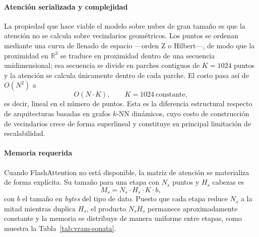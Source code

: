 \paragraph*{Atención serializada y complejidad}
La propiedad que hace viable el modelo sobre nubes de gran tamaño es que la
atención no se calcula sobre vecindarios geométricos. Los puntos se ordenan
mediante una curva de llenado de espacio ---orden Z o Hilbert---, de modo que la
proximidad en $\mathbb{R}^{3}$ se traduce en proximidad dentro de una secuencia
unidimensional; esa secuencia se divide en parches contiguos de $K=1024$ puntos y
la atención se calcula únicamente dentro de cada parche. El costo pasa así de
$O(N^{2})$ a
\begin{equation}
O(N\cdot K),\qquad K=1024\ \text{constante},
\label{eq:complejidad}
\end{equation}
es decir, lineal en el número de puntos. Esta es la diferencia estructural
respecto de arquitecturas basadas en grafos $k$-NN dinámicos, cuyo costo de
construcción de vecindarios crece de forma superlineal y constituye su principal
limitación de escalabilidad.

\paragraph*{Memoria requerida}
Cuando FlashAttention no está disponible, la matriz de atención se materializa de
forma explícita. Su tamaño para una etapa con $N_{s}$ puntos y $H_{s}$ cabezas es
\begin{equation}
M_{s}=N_{s}\cdot H_{s}\cdot K\cdot b ,
\label{eq:memoria}
\end{equation}
con $b$ el tamaño en \emph{bytes} del tipo de dato. Puesto que cada etapa reduce
$N_{s}$ a la mitad mientras duplica $H_{s}$, el producto $N_{s}H_{s}$ permanece
aproximadamente constante y la memoria se distribuye de manera uniforme entre
etapas, como muestra la Tabla~\ref{tab:vram-sonata}.

